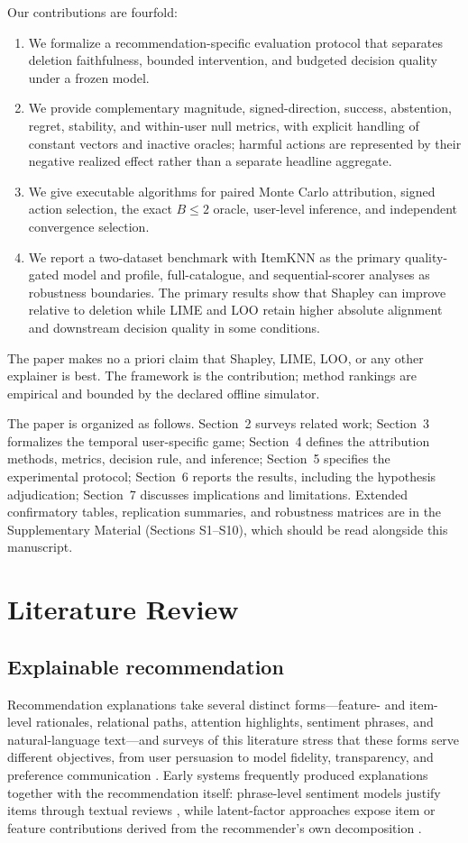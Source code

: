 \documentclass[a4paper,fleqn,doubleblind]{cas-sc}
\begin{document}
Our contributions are fourfold:
\begin{enumerate}
  \item We formalize a recommendation-specific evaluation protocol that separates deletion faithfulness, bounded intervention, and budgeted decision quality under a frozen model.
  \item We provide complementary magnitude, signed-direction, success, abstention, regret, stability, and within-user null metrics, with explicit handling of constant vectors and inactive oracles; harmful actions are represented by their negative realized effect rather than a separate headline aggregate.
  \item We give executable algorithms for paired Monte Carlo attribution, signed action selection, the exact $B\le2$ oracle, user-level inference, and independent convergence selection.
  \item We report a two-dataset benchmark with ItemKNN as the primary quality-gated model and profile, full-catalogue, and sequential-scorer analyses as robustness boundaries. The primary results show that Shapley can improve relative to deletion while LIME and LOO retain higher absolute alignment and downstream decision quality in some conditions.
\end{enumerate}

The paper makes no a priori claim that Shapley, LIME, LOO, or any other explainer is best. The framework is the contribution; method rankings are empirical and bounded by the declared offline simulator.



The paper is organized as follows. Section~2 surveys related work; Section~3 formalizes the temporal user-specific game; Section~4 defines the attribution methods, metrics, decision rule, and inference; Section~5 specifies the experimental protocol; Section~6 reports the results, including the hypothesis adjudication; Section~7 discusses implications and limitations. Extended confirmatory tables, replication summaries, and robustness matrices are in the Supplementary Material (Sections S1--S10), which should be read alongside this manuscript.

\section{Literature Review}
\subsection{Explainable recommendation}
Recommendation explanations take several distinct forms---feature- and item-level rationales, relational paths, attention highlights, sentiment phrases, and natural-language text---and surveys of this literature stress that these forms serve different objectives, from user persuasion to model fidelity, transparency, and preference communication \citep{zhang2020survey}. Early systems frequently produced explanations together with the recommendation itself: phrase-level sentiment models justify items through textual reviews \citep{zhang2014}, while latent-factor approaches expose item or feature contributions derived from the recommender's own decomposition \citep{peake2018,nobrega2019}.
\end{document}
